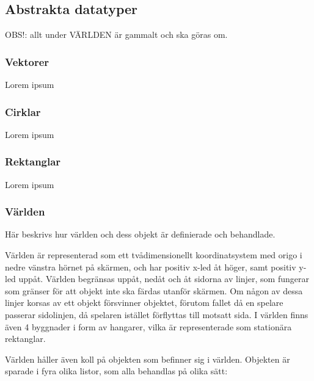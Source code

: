 \documentclass[12pt,a4paper]{article}
\newcounter{subsubsubsection}[subsubsection]
\begin{document}
\subsection{Abstrakta datatyper}
 OBS!: allt under VÄRLDEN är gammalt och ska göras om.

\subsubsection{Vektorer}

Lorem ipsum

\subsubsection{Cirklar}

Lorem ipsum

\subsubsection{Rektanglar}

Lorem ipsum

\subsubsection{Världen}

Här beskrivs hur världen och dess objekt är definierade och behandlade.

Världen är representerad som ett tvådimensionellt koordinatsystem med origo i nedre vänstra hörnet på skärmen, och har positiv x-led åt höger, samt positiv y-led uppåt. Världen begränsas uppåt, nedåt och åt sidorna av linjer, som fungerar som gränser för att objekt inte ska färdas utanför skärmen. Om någon av dessa linjer korsas av ett objekt försvinner objektet, förutom fallet då en spelare passerar sidolinjen, då spelaren istället förflyttas till motsatt sida. I världen finns även 4 byggnader i form av hangarer, vilka är representerade som stationära rektanglar.


Världen håller även koll på objekten som befinner sig i världen. Objekten är sparade i fyra olika listor, som alla behandlas på olika sätt:
\end{document}
